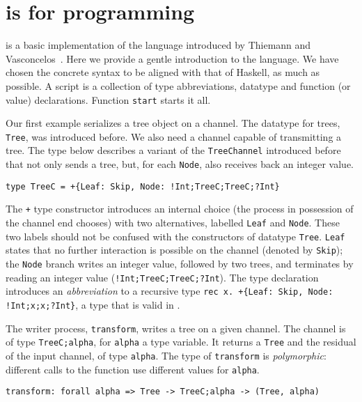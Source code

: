 \section{\freest{} is for programming}
\label{sec:programming}

\freest{} is a basic implementation of the language introduced by
Thiemann and Vasconcelos~\cite{DBLP:conf/icfp/ThiemannV16}. Here we
provide a gentle introduction to the language.
%
We have chosen the concrete syntax to be aligned with that of Haskell,
as much as possible. A \freest{} script is a collection of type
abbreviations, datatype and function (or value) declarations. Function
\lstinline|start| starts it all.

Our first example serializes a tree object on a channel. The datatype
for trees, \lstinline|Tree|, was introduced before.  We also need a
channel capable of transmitting a tree. The type below describes a
variant of the \lstinline|TreeChannel| introduced before that not only
sends a tree, but, for each \lstinline|Node|, also receives back an
integer value.
%
\begin{lstlisting}
type TreeC = +{Leaf: Skip, Node: !Int;TreeC;TreeC;?Int}
\end{lstlisting}

The \lstinline|+| type constructor introduces an internal choice (the
process in possession of the channel end chooses) with two
alternatives, labelled \lstinline|Leaf| and \lstinline|Node|. These
two labels should not be confused with the constructors of 
datatype \lstinline|Tree|. \lstinline|Leaf| states that no further
interaction is possible on the channel (denoted by \lstinline|Skip|);
the \lstinline|Node| branch writes an integer value, followed by two
trees, and terminates by reading an integer value
(\lstinline|!Int;TreeC;TreeC;?Int|).
%
The type declaration introduces an \emph{abbreviation} to a recursive
type \lstinline|rec x. +{Leaf: Skip, Node: !Int;x;x;?Int}|, a type
that is valid in \freest.

The writer process, \lstinline|transform|, writes a tree on a given
channel. The channel is of type \lstinline|TreeC;alpha|, for
\lstinline|alpha| a type variable. It returns a \lstinline|Tree| and
the residual of the input channel, of type \lstinline|alpha|. The type
of \lstinline|transform| is \emph{polymorphic}: different calls to the
function use different values for \lstinline|alpha|.

\begin{lstlisting}
transform: forall alpha => Tree -> TreeC;alpha -> (Tree, alpha)
\end{lstlisting}

